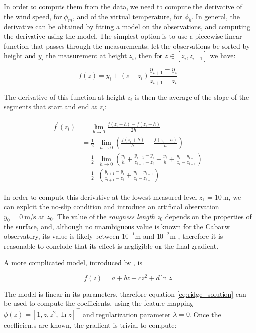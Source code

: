 \documentclass[12pt]{book}
\begin{document}
In order to compute them from the data, we need to compute the derivative of the wind speed, for $\phi_m$, and of the virtual temperature, for $\phi_h$. In general, the derivative can be obtained by fitting a model on the observations, and computing the derivative using the model. The simplest option is to use a piecewise linear function that passes through the measurements; let the observations be sorted by height and $y_i$ the measurement at height $z_i$, then for $z\in[z_i,z_{i+1}]$ we have:

\begin{equation}
f(z)=y_i+(z-z_i)\frac{y_{i+1}-y_i}{z_{i+1}-z_i}
\end{equation}

The derivative of this function at height $z_i$ is then the average of the slope of the segments that start and end at $z_i$:

\begin{align}
\label{eq:fd_gradient}
\begin{split}
f^\prime(z_i)&=\lim_{h\rightarrow 0}\frac{f(z_i+h)-f(z_i-h)}{2h} \\
&=\frac{1}{2}\cdot\lim_{h\rightarrow 0}\left(\frac{f(z_i+h)}{h}-\frac{f(z_i-h)}{h}\right) \\
&=\frac{1}{2}\cdot\lim_{h\rightarrow 0}\left(
\frac{y_i}{h}+\frac{y_{i+1}-y_i}{z_{i+1}-z_i}-\frac{y_i}{h}+\frac{y_i-y_{i-1}}{z_i-z_{i-1}}
\right)\\
&=\frac{1}{2}\cdot\left(
\frac{y_{i+1}-y_i}{z_{i+1}-z_i}+\frac{y_i-y_{i-1}}{z_i-z_{i-1}}
\right)
\end{split}
\end{align}

In order to compute this derivative at the lowest measured level $z_1=\SI{10}{\meter}$, we can exploit the no-slip condition and introduce an artificial observation $y_0=\SI{0}{\meter\per\second}$ at $z_0$. The value of the \emph{rougness length} $z_0$ depends on the properties of the surface, and, although no unambiguous value is known for the Cabauw observatory, its value is likely between $10^{-1}$m and $10^{-2}$m \cite{cabauw_z0, cabauw_night}, therefore it is reasonable to conclude that its effect is negligible on the final gradient.

A more complicated model, introduced by \cite{windlogprofile}, is

\begin{equation}
\label{eq:logmodel}
f(z)=a+bz+cz^2+d\ln z
\end{equation}

The model is linear in its parameters, therefore equation \ref{eq:ridge_solution} can be used to compute the coefficients, using the feature mapping $\phi(z)=\left[1,z,z^2,\ln z\right]^\intercal$ and regularization parameter $\lambda=0$. Once the coefficients are known, the gradient is trivial to compute:
\end{document}
